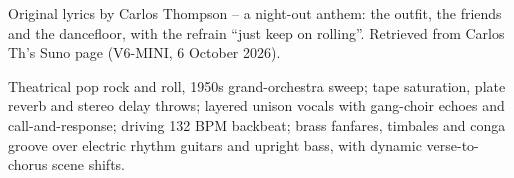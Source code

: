 
\label{sec:keep-on-rolling}
\begin{notes}
Original lyrics by Carlos Thompson -- a night-out anthem: the outfit, the friends and the dancefloor, with the refrain ``just keep on rolling''. Retrieved from Carlos Th's Suno page (V6-MINI, 6 October 2026).
\end{notes}
\begin{style}
Theatrical pop rock and roll, 1950s grand-orchestra sweep; tape saturation, plate reverb and stereo delay throws; layered unison vocals with gang-choir echoes and call-and-response; driving 132 BPM backbeat; brass fanfares, timbales and conga groove over electric rhythm guitars and upright bass, with dynamic verse-to-chorus scene shifts.
\end{style}
